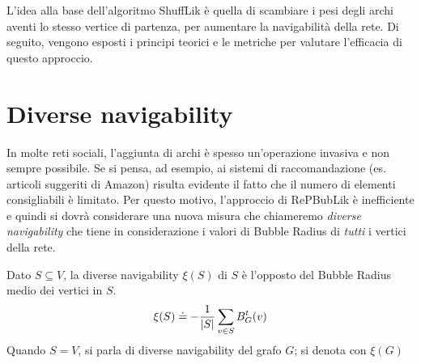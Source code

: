 L’idea alla base dell’algoritmo ShuffLik è quella di scambiare i pesi degli archi aventi lo stesso vertice di partenza, per 
aumentare la navigabilità della rete. 
Di seguito, vengono esposti i principi teorici e 
le metriche per valutare l'efficacia di questo approccio. 

\section{Diverse navigability}
In molte reti sociali, l'aggiunta di archi è spesso un'operazione invasiva e non sempre possibile. 
Se si pensa, ad esempio, ai sistemi di raccomandazione (es. articoli suggeriti di Amazon) risulta evidente il fatto che il numero di elementi 
consigliabili è limitato. Per questo motivo, l'approccio di RePBubLik è inefficiente e quindi si dovrà considerare una nuova 
misura che chiameremo \emph{diverse navigability} che tiene in considerazione i valori di Bubble Radius di \emph{tutti} i vertici della rete.
\begin{definition}
    Dato $S \subseteq V$, la diverse navigability $\xi(S)$ di $S$ è l'opposto del Bubble Radius medio dei vertici in $S$.
    \begin{equation}
        \xi(S)\doteq - {1\over{|S|}}\sum_{v\in S}{B_{G}^t(v)}
    \end{equation}
    Quando $S=V$, si parla di diverse navigability del grafo $G$; si denota con $\xi(G)$
\end{definition}

